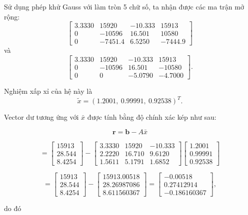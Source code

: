 Sử dụng phép khử Gauss với làm tròn 5 chữ số, 
ta nhận được các ma trận mở rộng:
\[
\begin{bmatrix}
3.3330 & 15920 & -10.333 & 15913 \\
0 & -10596 & 16.501 & 10580 \\
0 & -7451.4 & 6.5250 & -7444.9
\end{bmatrix}
\]
và
\[
\begin{bmatrix}
3.3330 & 15920 & -10.333 & 15913 \\
0 & -10596 & 16.501 & -10580 \\
0 & 0 & -5.0790 & -4.7000
\end{bmatrix}.
\]

Nghiệm xấp xỉ của hệ này là
\[
\tilde{x} = (1.2001,\ 0.99991,\ 0.92538)^T.
\]

Vector dư tương ứng với $\bar{x}$ được tính bằng độ chính xác kép như sau:

\[
\mathbf{r} = \mathbf{b} - A\bar{x}
\]

\[
=
\begin{bmatrix}
15913 \\[3pt]
28.544 \\[3pt]
8.4254
\end{bmatrix}
-
\begin{bmatrix}
3.3330 & 15920 & -10.333 \\[3pt]
2.2220 & 16.710 & 9.6120 \\[3pt]
1.5611 & 5.1791 & 1.6852
\end{bmatrix}
\begin{bmatrix}
1.2001 \\[3pt]
0.99991 \\[3pt]
0.92538
\end{bmatrix}
\]

\[
=
\begin{bmatrix}
15913 \\[3pt]
28.544 \\[3pt]
8.4254
\end{bmatrix}
-
\begin{bmatrix}
15913.00518 \\[3pt]
28.26987086 \\[3pt]
8.611560367
\end{bmatrix}
=
\begin{bmatrix}
-0.00518 \\[3pt]
0.27412914 \\[3pt]
-0.186160367
\end{bmatrix},
\]

do đó

